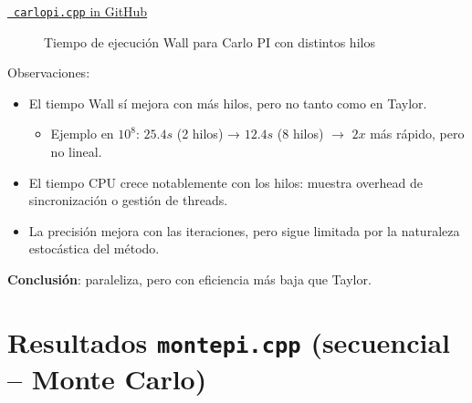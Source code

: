 \documentclass[a4paper,12pt]{article}
\begin{document}
\begin{center}
    \href{https://github.com/jucollas/parallel-programming/blob/main/submit-I/carlopi.cpp}{\faGithub\ \texttt{carlopi.cpp} in GitHub}
\end{center}

\begin{figure}[H]
\centering
{}
\caption{Tiempo de ejecución Wall para Carlo PI con distintos hilos}
\end{figure}

Observaciones:
\begin{itemize}
    \item  El tiempo Wall sí mejora con más hilos, pero no tanto como en Taylor.
    \begin{itemize}
        \item Ejemplo en $10^8$: $25.4 s$ (2 hilos) → $12.4 s$ (8 hilos) $\rightarrow$ $2x$ más rápido, pero no lineal. 
    \end{itemize}
    \item  El tiempo CPU crece notablemente con los hilos: muestra overhead de sincronización o gestión de threads.
    \item La precisión mejora con las iteraciones, pero sigue limitada por la naturaleza estocástica del método.
\end{itemize}
\textbf{Conclusión}: paraleliza, pero con eficiencia más baja que Taylor.

\newpage



\section*{Resultados \texttt{montepi.cpp} (secuencial -- Monte Carlo)}
\end{document}
